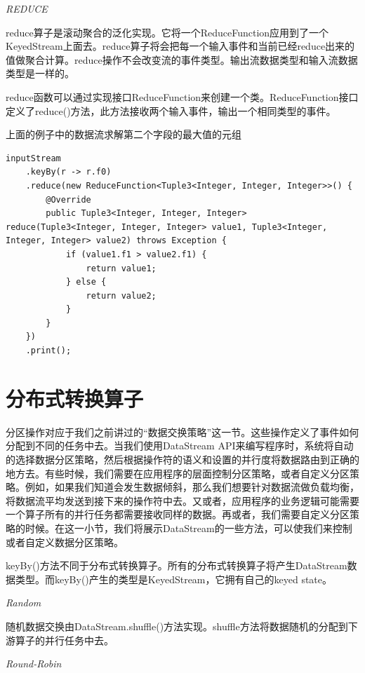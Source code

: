 \documentclass[cn,11pt,chinese]{elegantbook}
\begin{document}
\textit{REDUCE}

reduce算子是滚动聚合的泛化实现。它将一个ReduceFunction应用到了一个KeyedStream上面去。reduce算子将会把每一个输入事件和当前已经reduce出来的值做聚合计算。reduce操作不会改变流的事件类型。输出流数据类型和输入流数据类型是一样的。

reduce函数可以通过实现接口ReduceFunction来创建一个类。ReduceFunction接口定义了reduce()方法，此方法接收两个输入事件，输出一个相同类型的事件。

上面的例子中的数据流求解第二个字段的最大值的元组

\begin{verbatim}
inputStream
    .keyBy(r -> r.f0)
    .reduce(new ReduceFunction<Tuple3<Integer, Integer, Integer>>() {
        @Override
        public Tuple3<Integer, Integer, Integer> reduce(Tuple3<Integer, Integer, Integer> value1, Tuple3<Integer, Integer, Integer> value2) throws Exception {
            if (value1.f1 > value2.f1) {
                return value1;
            } else {
                return value2;
            }
        }
    })
    .print();
\end{verbatim}

\section{分布式转换算子}

分区操作对应于我们之前讲过的“数据交换策略”这一节。这些操作定义了事件如何分配到不同的任务中去。当我们使用DataStream API来编写程序时，系统将自动的选择数据分区策略，然后根据操作符的语义和设置的并行度将数据路由到正确的地方去。有些时候，我们需要在应用程序的层面控制分区策略，或者自定义分区策略。例如，如果我们知道会发生数据倾斜，那么我们想要针对数据流做负载均衡，将数据流平均发送到接下来的操作符中去。又或者，应用程序的业务逻辑可能需要一个算子所有的并行任务都需要接收同样的数据。再或者，我们需要自定义分区策略的时候。在这一小节，我们将展示DataStream的一些方法，可以使我们来控制或者自定义数据分区策略。

\begin{note}
    keyBy()方法不同于分布式转换算子。所有的分布式转换算子将产生DataStream数据类型。而keyBy()产生的类型是KeyedStream，它拥有自己的keyed state。
\end{note}

\textit{Random}

随机数据交换由DataStream.shuffle()方法实现。shuffle方法将数据随机的分配到下游算子的并行任务中去。

\textit{Round-Robin}
\end{document}
